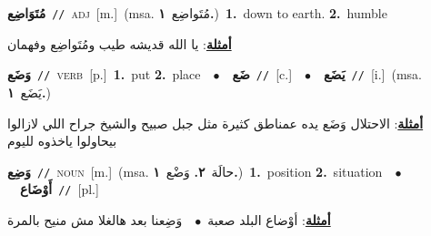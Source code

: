 \documentclass[10pt,a4paper,twoside]{article} %
\begin{document}
\begin{multicols}{2}
{\setlength\topsep{0pt}\textbf{\foreignlanguage{arabic}{مُتَوَاضِع}}\ {\color{gray}\texttt{//}\color{black}}\ \textsc{adj}\ [m.]\ \color{gray}(msa. \foreignlanguage{arabic}{مُتَواضِع}~\foreignlanguage{arabic}{\textbf{١.}})\color{black}\ \textbf{1.}~down to earth.  \textbf{2.}~humble\  \begin{flushright}\color{gray}\foreignlanguage{arabic}{\textbf{\underline{\foreignlanguage{arabic}{أمثلة}}}: يا الله قديشه طيب ومُتَواضِع وفهمان}\end{flushright}\color{black}} \vspace{2mm}

{\setlength\topsep{0pt}\textbf{\foreignlanguage{arabic}{وَضَع}}\ {\color{gray}\texttt{//}\color{black}}\ \textsc{verb}\ [p.]\ \textbf{1.}~put  \textbf{2.}~place\ \ $\bullet$\ \ \setlength\topsep{0pt}\textbf{\foreignlanguage{arabic}{ضَع}}\ {\color{gray}\texttt{//}\color{black}}\ [c.]\ \ $\bullet$\ \ \setlength\topsep{0pt}\textbf{\foreignlanguage{arabic}{يَضَع}}\ {\color{gray}\texttt{//}\color{black}}\ [i.]\ \color{gray}(msa. \foreignlanguage{arabic}{يَضَع}~\foreignlanguage{arabic}{\textbf{١.}})\color{black}\  \begin{flushright}\color{gray}\foreignlanguage{arabic}{\textbf{\underline{\foreignlanguage{arabic}{أمثلة}}}: الاحتلال وَضَع يده عمناطق كثيرة مثل جبل صبيح والشيخ جراح اللي لازالوا بيحاولوا ياخذوه لليوم}\end{flushright}\color{black}} \vspace{2mm}

{\setlength\topsep{0pt}\textbf{\foreignlanguage{arabic}{وَضِع}}\ {\color{gray}\texttt{//}\color{black}}\ \textsc{noun}\ [m.]\ \color{gray}(msa. \foreignlanguage{arabic}{حالَة}~\foreignlanguage{arabic}{\textbf{٢.}}  \foreignlanguage{arabic}{وَضْع}~\foreignlanguage{arabic}{\textbf{١.}})\color{black}\ \textbf{1.}~position  \textbf{2.}~situation\ \ $\bullet$\ \ \setlength\topsep{0pt}\textbf{\foreignlanguage{arabic}{أَوْضَاع}}\ {\color{gray}\texttt{//}\color{black}}\ [pl.]\  \begin{flushright}\color{gray}\foreignlanguage{arabic}{\textbf{\underline{\foreignlanguage{arabic}{أمثلة}}}: أوْضاع البلد صعبة\ $\bullet$\ \  وَضِعنا بعد هالغلا مش منيح بالمرة}\end{flushright}\color{black}} \vspace{2mm}


\end{multicols}
\end{document}
